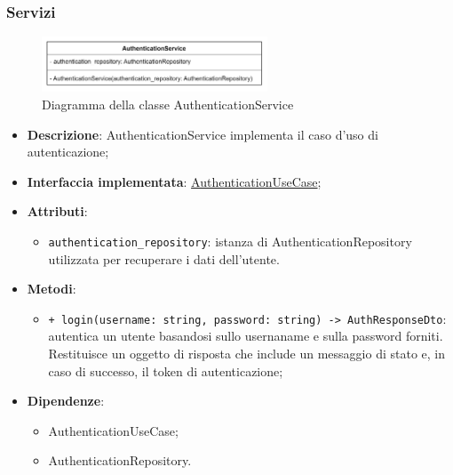 \subsubsection{Servizi}

 \label{AuthenticationService}
\begin{figure}[H]
    \centering
    \includegraphics[width=0.6\textwidth]{assets/Backend/authentication_service.png}
    \caption{Diagramma della classe AuthenticationService}
  \end{figure}
\begin{itemize}
    \item \textbf{Descrizione}: AuthenticationService implementa il caso d'uso di autenticazione;
    \item \textbf{Interfaccia implementata}: \hyperref[AuthenticationUseCase]{AuthenticationUseCase};
    \item \textbf{Attributi}:
    \begin{itemize}
        \item \texttt{authentication\_repository}: istanza di AuthenticationRepository utilizzata per recuperare i dati dell'utente.
    \end{itemize}
    \item \textbf{Metodi}: 
    \begin{itemize}
        \item \texttt{+ login(username: string, password: string) -> AuthResponseDto}: autentica un utente basandosi sullo usernaname e sulla password forniti. Restituisce un oggetto di risposta che include un messaggio di stato e, in caso di successo, il token di autenticazione;
    \end{itemize}
    \item \textbf{Dipendenze}:
    \begin{itemize}
        \item AuthenticationUseCase;
        \item AuthenticationRepository.
    \end{itemize}
\end{itemize}  

